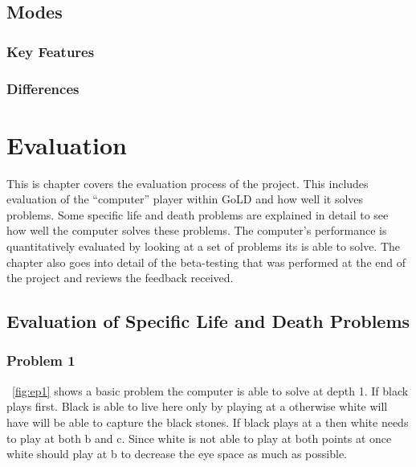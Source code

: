 \documentclass{l4proj}
\begin{document}
\section{Modes}

\subsection{Key Features}


\subsection{Differences}




\chapter{Evaluation}

This is chapter covers the evaluation process of the project. This includes evaluation of the “computer” player within GoLD and how well it solves problems. Some specific life and death problems are explained in detail to see how well the computer solves these problems. The computer’s performance is quantitatively evaluated by looking at a set of problems its is able to solve. The chapter also goes into detail of the beta-testing that was performed at the end of the project and reviews the feedback received.

\section{Evaluation of Specific Life and Death Problems}
\subsection{Problem 1}
~\autoref{fig:ep1}  shows a basic problem the computer is able to solve at depth 1. If black plays first. Black is able to live here only by playing at a otherwise white will have will be able to capture the black stones. If black plays at a then white needs to play at both b and c. Since white is not able to play at both points at once white should play at b to decrease the eye space as much as possible.
\end{document}
